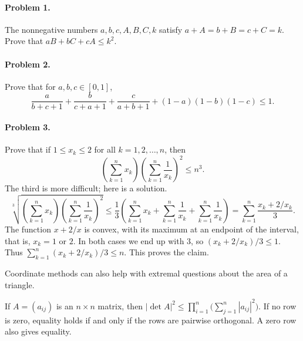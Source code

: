 \documentclass[11pt,a4paper]{article}
\begin{document}
\paragraph{Problem 1.}
The nonnegative numbers $a,b,c,A,B,C,k$ satisfy $a+A=b+B=c+C=k$.
Prove that $aB+bC+cA\leq k^2$.
\paragraph{Problem 2.}
Prove that for $a,b,c\in[0,1]$,
\[\frac a{b+c+1}+\frac b{c+a+1}+\frac c{a+b+1}+(1-a)(1-b)(1-c)\leq1.\]
\paragraph{Problem 3.}
Prove that if $1\leq x_k\leq2$ for all $k=1,2,\ldots,n$, then
\[\left(\sum_{k=1}^n x_k\right)\left(\sum_{k=1}^n\frac1{x_k}\right)^2\leq n^3.\]
The third is more difficult; here is a solution.
\[\sqrt[3]{\left(\sum_{k=1}^n x_k\right)\left(\sum_{k=1}^n\frac1{x_k}\right)^2}
\leq\frac13\left(\sum_{k=1}^n x_k+\sum_{k=1}^n\frac1{x_k}+\sum_{k=1}^n\frac1{x_k}\right)
=\sum_{k=1}^n\frac{x_k+2/x_k}{3}.\]
The function $x+2/x$ is convex, with its maximum at an endpoint of the interval, that is, $x_k=1$ or $2$.
In both cases we end up with $3$, so $(x_k+2/x_k)/3\leq1$.
Thus $\sum_{k=1}^n(x_k+2/x_k)/3\leq n$.
This proves the claim.


Coordinate methods can also help with extremal questions about the area of a triangle.
\setcounter{theorem}{101}\begin{lemma}
If $A=(a_{ij})$ is an $n\times n$ matrix, then
$|\det A|^2\leq\prod_{i=1}^n\bigl(\sum_{j=1}^n|a_{ij}|^2\bigr)$.
If no row is zero, equality holds if and only if the rows are pairwise
orthogonal. A zero row also gives equality.
\end{lemma}
\end{document}
